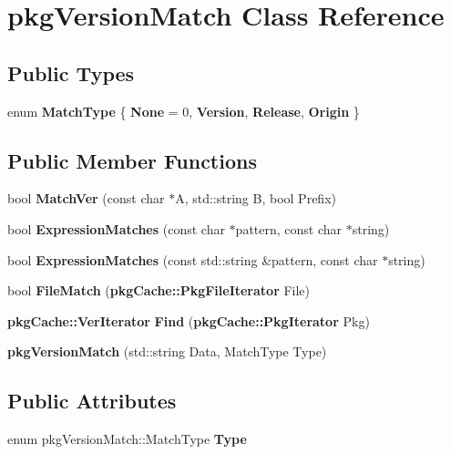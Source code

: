 \section{pkg\-Version\-Match \-Class \-Reference}
\label{classpkgVersionMatch}
\subsection*{\-Public \-Types}
\begin{DoxyCompactItemize}
\item 
enum {\bfseries \-Match\-Type} \{ {\bfseries \-None} =  0, 
{\bfseries \-Version}, 
{\bfseries \-Release}, 
{\bfseries \-Origin}
 \}
\end{DoxyCompactItemize}
\subsection*{\-Public \-Member \-Functions}
\begin{DoxyCompactItemize}
\item 
bool {\bfseries \-Match\-Ver} (const char $\ast$\-A, std\-::string \-B, bool \-Prefix)\label{classpkgVersionMatch_a8cc6c2e0bca311bb24b9308289a249fc}

\item 
bool {\bfseries \-Expression\-Matches} (const char $\ast$pattern, const char $\ast$string)\label{classpkgVersionMatch_af85a9770a03c902bce519d30f6f9f6cd}

\item 
bool {\bfseries \-Expression\-Matches} (const std\-::string \&pattern, const char $\ast$string)\label{classpkgVersionMatch_a8dcc2fa3307cf326441f296a5d9ab4f2}

\item 
bool {\bfseries \-File\-Match} ({\bf pkg\-Cache\-::\-Pkg\-File\-Iterator} \-File)\label{classpkgVersionMatch_a8813c348a82cff3810e06decfd41b2b4}

\item 
{\bf pkg\-Cache\-::\-Ver\-Iterator} {\bfseries \-Find} ({\bf pkg\-Cache\-::\-Pkg\-Iterator} \-Pkg)\label{classpkgVersionMatch_aa59e9ff1e87197af6b41f8e3eb5f2708}

\item 
{\bfseries pkg\-Version\-Match} (std\-::string \-Data, \-Match\-Type \-Type)\label{classpkgVersionMatch_a1d107f8668442654649e7d71aa705ca6}

\end{DoxyCompactItemize}
\subsection*{\-Public \-Attributes}
\begin{DoxyCompactItemize}
\item 
enum pkg\-Version\-Match\-::\-Match\-Type {\bfseries \-Type}\label{classpkgVersionMatch_ae35c82f12a9063b795a69071b304f8d0}

\end{DoxyCompactItemize}


